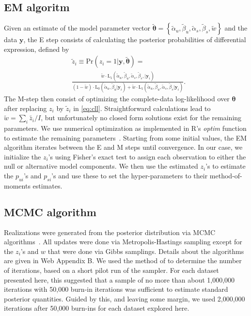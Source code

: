 \documentclass[useAMS,referee,usenatbib]{biom}
\begin{document}
\subsection{EM algoritm}
Given an estimate of the model parameter vector $\tilde{\boldsymbol{\theta}}=\left\{\tilde{\alpha}_u,\tilde{\beta}_u,\tilde{\alpha}_s,\tilde{\beta}_s,\tilde{w}\right\}$ and the data $\mathbf{y}$, the E step consists of calculating the posterior probabilities of differential expression, defined by
\[
\begin{split}
&\tilde z_{i} \equiv \mathrm{Pr}(z_i=1|\mathbf{y},\tilde{\boldsymbol{\theta}})=\\ &\frac{\tilde{w} \cdot \mathrm{L}_1(\tilde{\alpha}_u,\tilde{\beta}_u,\tilde{\alpha}_s,\tilde{\beta}_s,|\mathbf{y}_i)}{(1-\tilde{w})\cdot\mathrm{L}_0(\tilde{\alpha}_u,\tilde{\beta}_u|\mathbf{y}_i)+\tilde{w}\cdot\mathrm{L}_1(\tilde{\alpha}_u,\tilde{\beta}_u,\tilde{\alpha}_s,\tilde{\beta}_s|\mathbf{y}_i)}.
\end{split}
\] 
The M-step then consist of optimizing the complete-data log-likelihood over $\boldsymbol{\theta}$ after replacing $z_i$ by $\tilde{z}_{i}$ in \eqref{eq:cll}. Straightforward calculations lead to 
$\tilde w = \sum_i{\tilde{z_i}}/I$, but unfortunately no closed form solutions exist for the remaining parameters. We use numerical optimization as implemented in R's \textit{optim} function to estimate the remaining parameters~\citep{Ihaka:1996ud}.  Starting from some initial values, the EM algorithm iterates between the E and M steps until convergence. In our case, we initialize the $z_{i}$'s using Fisher's exact test to assign each observation to either the null or alternative model components. We then use the estimated $z_i$'s to estimate the $p_{ui}$'s and $p_{si}$'s and use these to set the hyper-parameters to their method-of-moments estimates.

\subsection{MCMC algorithm}
Realizations were generated from the posterior distribution via MCMC algorithms~\citep{Gelfand:1996wc}. All updates were done via Metropolis-Hastings sampling except for the $z_i$'s and $w$ that were done via Gibbs samplings.
Details about the algorithms are given in Web Appendix B. We used the method of \cite{Raftery:1992vp,Raftery:1996ws} to determine the number of iterations, based on a short pilot run of the sampler. For each dataset presented here, this suggested that a sample of no more than about 1,000,000 iterations with 50,000 burn-in iterations was sufficient to estimate standard posterior quantities. Guided by this, and leaving some margin, we used 2,000,000 iterations after 50,000  burn-ins for each dataset explored here. 
\end{document}
